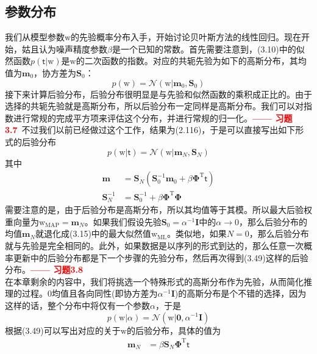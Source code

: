\documentclass[b5paper]{book}
\numberwithin{equation}{chapter}
\newcommand {\bw} {\boldsymbol{\mathrm{w}}}
\newcommand {\sft} {\boldsymbol{\mathsf{t}}}
\newcommand {\rmT} {\mathrm{T}}
\newcommand {\bfPhi} {\boldsymbol{\Phi}}
\newcommand {\calN} {\mathcal{N}}
\begin{document}
	\subsection{参数分布}
	\textnormal{
	我们从模型参数$\bw$的先验概率分布入手，开始讨论贝叶斯方法的线性回归。现在开始，姑且认为噪声精度参数$\beta$是一个已知的常数。首先需要注意到，(3.10)中的似然函数$p(\sft | \bw)$是$\bw$的二次函数的指数。对应的共轭先验为如下的高斯分布，其均值为$\mathbf{m}_0$，协方差为$\mathbf{S}_0$：
	\begin{equation}
		p(\bw) = \calN (\bw|\mathbf{m}_0, \mathbf{S}_0)
	\end{equation}
	\indent 接下来计算后验分布，后验分布很明显是与先验和似然函数的乘积成正比的。由于选择的共轭先验就是高斯分布，所以后验分布一定同样是高斯分布。我们可以对指数进行常规的完成平方项来评估这个分布，并进行常规的归一化。\textcolor{red}{\textbf{—— 习题3.7}}\ 不过我们以前已经做过这个工作，结果为(2.116)，于是可以直接写出如下形式的后验分布
	\begin{equation}
		p(\bw|\sft) = \calN (\bw| \mathbf{m}_N, \mathbf{S}_N)
	\end{equation}
	其中
	\begin{align}
		\mathbf{m} &= \mathbf{S}_N(\mathbf{S}_0^{-1}\mathbf{m}_0 + \beta \bfPhi^{\rmT} \sft) \\
		\mathbf{S}_N^{-1} &= \mathbf{S}_0^{-1} + \beta \bfPhi^{\rmT} \bfPhi
	\end{align}
	需要注意的是，由于后验分布是高斯分布，所以其均值等于其模。所以最大后验权重向量为$\bw_{\mathrm{MAP}} = \mathbf{m}_N$。如果我们假设先验$\mathbf{S}_0 = \alpha^{-1}\mathbf{I}$中的$\alpha \rightarrow 0$，那么后验分布的均值$\mathbf{m}_N$就退化成(3.15)中的最大似然值$\bw_{\mathrm{ML}}$。类似地，如果$N=0$，那么后验分布就与先验是完全相同的。此外，如果数据是以序列的形式到达的，那么任意一次概率更新中的后验分布都是下一个步骤的先验分布，然后再次得到(3.49)这样的后验分布。\textcolor{red}{\textbf{—— 习题3.8}} \\
	\indent 在本章剩余的内容中，我们将挑选一个特殊形式的高斯分布作为先验，从而简化推理的过程。0均值且各向同性(即协方差为$\alpha^{-1}\mathbf{I}$)的高斯分布是个不错的选择，因为这样的话，整个分布中将仅有一个参数$\alpha$，于是
	\begin{equation}
		p(\bw|\alpha) = \calN (\bw | \mathbf{0} , \alpha^{-1}\mathbf{I})
	\end{equation}
	根据(3.49)可以写出对应的关于$\bw$的后验分布，具体的值为
	\begin{align}
		\mathbf{m}_N &= \beta \mathbf{S}_N\bfPhi^{\rmT}\sft \\

\end{align}}
\end{document}
